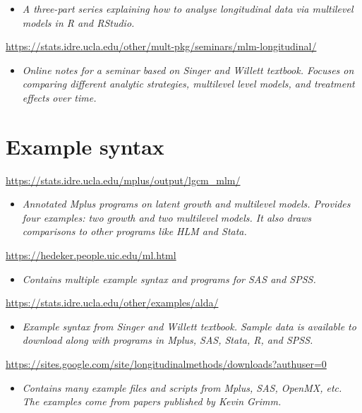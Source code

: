 \documentclass[
]{book}
\providecommand{\tightlist}{%
  \setlength{\itemsep}{0pt}\setlength{\parskip}{0pt}}
\begin{document}
\begin{itemize}
\tightlist
\item
  \emph{A three-part series explaining how to analyse longitudinal data via multilevel models in R and RStudio.}
\end{itemize}

\url{https://stats.idre.ucla.edu/other/mult-pkg/seminars/mlm-longitudinal/}

\begin{itemize}
\tightlist
\item
  \emph{Online notes for a seminar based on Singer and Willett textbook. Focuses on comparing different analytic strategies, multilevel level models, and treatment effects over time. }
\end{itemize}

\section{Example syntax}\label{example-syntax}

\url{https://stats.idre.ucla.edu/mplus/output/lgcm_mlm/}

\begin{itemize}
\tightlist
\item
  \emph{Annotated Mplus programs on latent growth and multilevel models. Provides four examples: two growth and two multilevel models. It also draws comparisons to other programs like HLM and Stata. }
\end{itemize}

\url{https://hedeker.people.uic.edu/ml.html}

\begin{itemize}
\tightlist
\item
  \emph{Contains multiple example syntax and programs for SAS and SPSS.}
\end{itemize}

\url{https://stats.idre.ucla.edu/other/examples/alda/}

\begin{itemize}
\tightlist
\item
  \emph{Example syntax from Singer and Willett textbook. Sample data is available to download along with programs in Mplus, SAS, Stata, R, and SPSS. }
\end{itemize}

\url{https://sites.google.com/site/longitudinalmethods/downloads?authuser=0}

\begin{itemize}
\tightlist
\item
  \emph{Contains many example files and scripts from Mplus, SAS, OpenMX, etc. The examples come from papers published by Kevin Grimm.}
\end{itemize}
\end{document}
